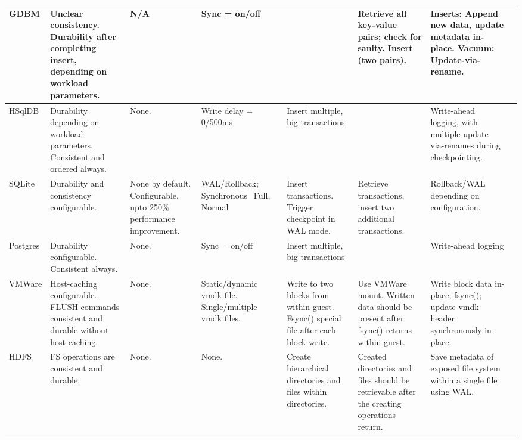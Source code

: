 \begin{tabular}{|p{1.5cm}|p{2.5cm}|p{2.0cm}|p{2.0cm}|p{2.5cm}|p{2.5cm}|p{2.5cm}|p{2.5cm}|}
GDBM & Unclear consistency. Durability after completing insert, depending on workload parameters. & N\slash{}A & Sync = on\slash{}off &  & Retrieve all key-value pairs; check for sanity. Insert (two pairs). & Inserts: Append new data, update metadata in-place. Vacuum: Update-via-rename. \\ \hline
HSqlDB & Durability depending on workload parameters. Consistent and ordered always. & None. & Write delay = 0\slash{}500ms & Insert multiple, big transactions &  & Write-ahead logging, with multiple update-via-renames during checkpointing. \\ \cline{1-5}\cline{7-8}
SQLite & Durability and consistency configurable. & None by default. Configurable, upto 250\% performance improvement. & WAL\slash{}Rollback; Synchronous=Full, Normal & Insert transactions. Trigger checkpoint in WAL mode. & Retrieve transactions, insert two additional transactions. & Rollback\slash{}WAL depending on configuration.  \\  \cline{1-5}\cline{7-8}
Postgres & Durability configurable. Consistent always. & None. & Sync = on\slash{}off & Insert multiple, big transactions &  & Write-ahead logging \\ \hline
VMWare & Host-caching configurable. FLUSH commands consistent and durable without host-caching. & None. & Static\slash{}dynamic vmdk file. Single\slash{}multiple vmdk files. & Write to two blocks from within guest. Fsync() special file after each block-write. & Use VMWare mount. Written data should be present after fsync() returns within guest. & Write block data in-place; fsync(); update vmdk header synchronously in-place. \\ \hline
HDFS & FS operations are consistent and durable. & None. & None. & Create hierarchical directories and files within directories. & Created directories and files should be retrievable after the creating operations return. & Save metadata of exposed file system within a single file using WAL. \\ \hline
\end{tabular}
